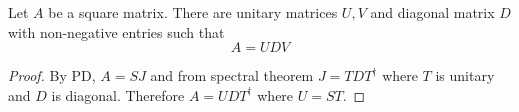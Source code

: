 \begin{theorem}
    Let \(A\) be a square matrix. There are unitary matrices \(U,V\) and diagonal matrix \(D\) with non-negative entries such that 
    \begin{equation*}
        A = UDV
    \end{equation*}
\end{theorem}
\begin{proof}
    By PD, \(A = SJ\) and from spectral theorem \(J = TDT^{\dagger}\) where \(T\) is unitary and \(D\) is diagonal. Therefore \(A = U D T^{\dagger}\) where \(U = ST\).
\end{proof}
